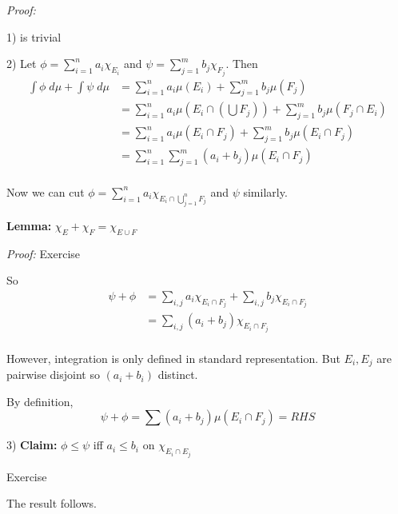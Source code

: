 \documentclass[12pt]{report}
\newcommand{\X}{\chi}
\newenvironment*{tbox}[2][gray]{
    \begin{tcolorbox}[
        parbox=false,
        colback=#1!5!white,
        colframe=#1!75!black,
        breakable,
        title={#2}
    ]}
    {\end{tcolorbox}}
\newenvironment*{proof}[1][blue]{
\begin{tcolorbox}[
    parbox=false,
    colback=#1!5!white,
    colframe=#1!75!black,
    breakable
]}
{\end{tcolorbox}}
\begin{document}
    \begin{tbox}{\textbf{Proposition:} If $\phi$ and $\psi$ are two simple functions, 
        \begin{enumerate} 
            \item If $c \geq 0$, $\int c \phi \; d\mu= c\int \phi \; d\mu$ 
            \item $\int \phi + \psi  \; d\mu = \int \phi\; d\mu + \int \psi \; d\mu$
            \item If $\phi \leq \psi$, then $\int \phi\; d\mu \leq \int \psi\; d\mu$
        \end{enumerate} }
        \emph{Proof:} 

        1) is trivial 

        2) Let $\phi = \sum_{i=1}^{n} a_i \X_{E_i}$ and $\psi = \sum_{j=1}^{m} b_j \X_{F_j}$. Then
        \begin{align*}
            \int \phi\; d\mu + \int \psi\; d\mu &= \sum_{i=1}^{n} a_i \mu(E_i) + \sum_{j=1}^{m} b_j \mu(F_j)\\
            &= \sum_{i=1}^{n} a_i \mu(E_i \cap (\bigcup F_j)) + \sum_{j=1}^{m} b_j \mu(F_j \cap E_i)\\ 
            &= \sum_{i=1}^{n} a_i \mu(E_i \cap F_j) + \sum_{j=1}^{m} b_j \mu(E_i \cap F_j)\\
            &= \sum_{i=1}^{n} \sum_{j=1}^{m} (a_i + b_j) \mu(E_i \cap F_j)\\
        \end{align*}

        Now we can cut $\phi = \sum_{i=1}^{n} a_i \X_{E_i \cap \bigcup_{j=1}^n F_j}$ and $\psi$ similarly. 

        \textbf{Lemma:} $\X_E + \X_F = \X_{E \cup F}$

        \begin{proof}
            \emph{Proof:} Exercise
        \end{proof}

        So 
        \begin{align*}
            \psi + \phi &= \sum_{i, j} a_i \X_{E_i \cap F_j} + \sum_{i, j} b_j \X_{E_i \cap F_j}\\
            &= \sum_{i, j} (a_i + b_j) \X_{E_i \cap F_j}\\
        \end{align*}

        However, integration is only defined in standard representation. But $E_i, E_j$ are pairwise disjoint so $(a_i + b_i)$ distinct. 

        By definition, 
        \[\psi + \phi = \sum (a_i + b_j) \mu(E_i \cap F_j) = RHS\] 
    
        3) \textbf{Claim:} $\phi \leq \psi$ iff $a_i \leq b_i$ on $\X_{E_i \cap E_j}$

        \begin{proof}
            Exercise
        \end{proof}
        
        The result follows. 

    \end{tbox}
\end{document}
